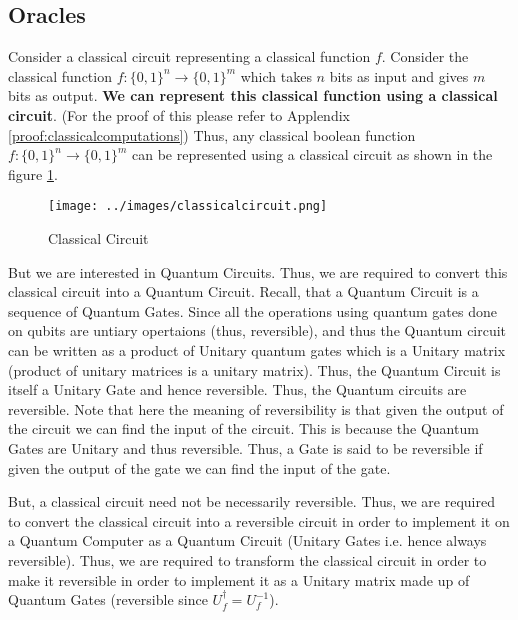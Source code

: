 \documentclass[12pt, oneside]{book}
\theoremstyle{definition}
\theoremstyle{definition}
\theoremstyle{remark}
\begin{document}
\subsection{Oracles}
Consider a classical circuit representing a classical function $f$. 
Consider the classical function $f:\{0,1\}^n \rightarrow \{0,1\}^m$ which takes $n$ bits as input and gives $m$ bits as output.
\textbf{We can represent this classical function using a classical circuit}. (For the proof of this please refer to Applendix \ref{proof:classicalcomputations})
Thus, any classical boolean function $f:\{0,1\}^n \rightarrow \{0,1\}^m$ can be represented using a classical circuit as shown in the figure \ref{classicalcircuit}.
\begin{figure}[H]
    \centering
    \texttt{[image: ../images/classicalcircuit.png]}
    \caption{Classical Circuit}
    \label{classicalcircuit}
\end{figure}
But we are interested in Quantum Circuits. Thus, we are required to convert this classical circuit into a Quantum Circuit.
Recall, that a Quantum Circuit is a sequence of Quantum Gates. Since all the operations using quantum gates done on qubits  are untiary opertaions (thus, reversible),
and thus the Quantum circuit can be written as a product of Unitary quantum gates which is a Unitary matrix (product of unitary matrices is a unitary matrix). Thus, the Quantum Circuit is itself a Unitary Gate and hence reversible. Thus, the Quantum circuits are reversible.
Note that here the meaning of reversibility is that given the output of the circuit we can find the input of the circuit. This is because the Quantum Gates are Unitary and thus reversible.
Thus, a Gate is said to be reversible if given the output of the gate we can find the input of the gate. 

But, a classical circuit need not be necessarily reversible. Thus, we are required to convert the classical circuit into a reversible circuit in order to implement it on a Quantum Computer as a Quantum Circuit (Unitary Gates i.e. hence always reversible).
Thus, we are required to transform the classical circuit in order to make it reversible in order to implement it as a Unitary matrix made up of Quantum Gates (reversible since $U_f^{\dagger}=U_f^{-1}$).
\end{document}

